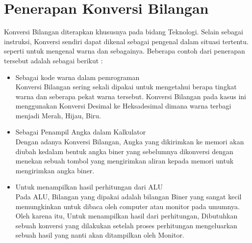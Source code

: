 \section{Penerapan Konversi Bilangan}
Konversi Bilangan diterapkan khususnya pada bidang Teknologi. Selain sebagai instruksi, Konversi sendiri dapat dikenal sebagai pengenal dalam situasi tertentu. seperti untuk mengenal warna dan sebagainya. Beberapa contoh dari penerapan tersebut adalah sebagai berikut : 
\begin{itemize}
\item Sebagai kode warna dalam pemrograman \\ Konversi Bilangan sering sekali dipakai untuk mengetahui berapa tingkat warna dan seberapa pekat warna tersebut. Konversi Bilangan pada kasus ini menggunakan Konversi Desimal ke Heksadesimal dimana warna terbagi menjadi Merah, Hijau, Biru. 
\item Sebagai Penampil Angka dalam Kalkulator \\ Dengan adanya Konversi Bilangan, Angka yang dikirimkan ke memori akan diubah kedalam bentuk angka biner yang sebelumnya dikonversi dengan menekan sebuah tombol yang mengirimkan aliran kepada memori untuk mengirimkan angka biner.
\item Untuk menampilkan hasil perhitungan dari ALU \\ Pada ALU, Bilangan yang dipakai adalah bilangan Biner yang sangat kecil memungkinkan untuk dibaca oleh computer atau monitor pada umumnya. Oleh karena itu, Untuk menampilkan hasil dari perhitungan, Dibutuhkan sebuah konversi yang dilakukan setelah proses perhitungan mengeluarkan sebuah hasil yang nanti akan ditampilkan oleh Monitor.
\end{itemize}

\cite {Sriwasito, Putut}
\cite {Hutahaean, Jeperson}
\cite {Gulo, Famalua)}